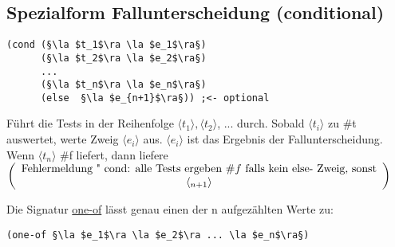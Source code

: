 \documentclass[a4paper,12pt]{article}
\newcommand{\la}{$\langle$}
\newcommand{\ra}{$\rangle$}
\begin{document}
\subsection{Spezialform Fallunterscheidung (conditional)}
\begin{lstlisting}[style=customc]
(cond (§\la $t_1$\ra \la $e_1$\ra§)
      (§\la $t_2$\ra \la $e_2$\ra§)
      ...
      (§\la $t_n$\ra \la $e_n$\ra§)
      (else  §\la $e_{n+1}$\ra§)) ;<- optional
\end{lstlisting}
Führt die Tests in der Reihenfolge $\langle t_1 \rangle, \langle t_2 \rangle$, ... durch. Sobald $\langle t_i\rangle$ zu \#t auswertet, werte Zweig $\langle e_i\rangle$ aus. $\langle e_i\rangle $ ist das Ergebnis der Fallunterscheidung. Wenn $\langle t_n\rangle$ \#f liefert, dann liefere \\
$\left(\begin{array}{l}\text{Fehlermeldung " cond: alle Tests ergeben }\#f \text{ falls kein else- Zweig, sonst}\\ \hfil \langle_{n+1}\rangle \end{array}\right)$

Die Signatur \uline{one-of} lässt genau einen der n aufgezählten Werte zu:\\
\begin{lstlisting}[style=customc]
(one-of §\la $e_1$\ra \la $e_2$\ra ... \la $e_n$\ra§)
\end{lstlisting}
\end{document}
